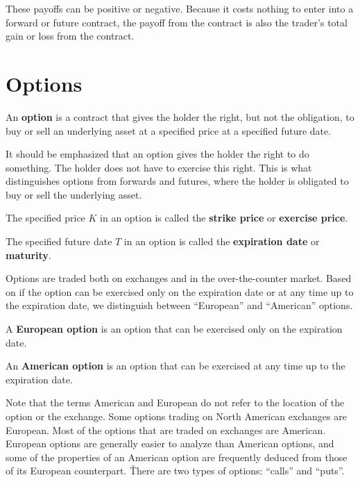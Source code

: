 These payoffs can be positive or negative. Because it costs nothing to enter into a forward or future contract, the
payoff from the contract is also the trader's total gain or loss from the contract.

\vspace{5pt}

\section{Options}

\bd[Option]
An \textbf{option} is a contract that gives the holder the right, but not the obligation, to buy or sell an underlying
asset at a specified price at a specified future date.
\ed

It should be emphasized that an option gives the holder the right to do something. The holder does not have to
exercise this right. This is what distinguishes options from forwards and futures, where the holder is obligated to
buy or sell the underlying asset.

The specified price $K$ in an option is called the \textbf{strike price} or \textbf{exercise price}.
\ed

The specified future date $T$ in an option is called the \textbf{expiration date} or \textbf{maturity}.
\ed

Options are traded both on exchanges and in the over-the-counter market. Based on if the option can be exercised only
on the expiration date or at any time up to the expiration date, we distinguish between ``European'' and ``American''
options.

A \textbf{European option} is an option that can be exercised only on the expiration date.
\ed

An \textbf{American option} is an option that can be exercised at any time up to the expiration date.
\ed

Note that the terms American and European do not refer to the location of the option or the exchange. Some options
trading on North American exchanges are European. Most of the options that are traded on exchanges are American.
European options are generally easier to analyze than American options, and some of the properties of an American
option are frequently deduced from those of its European counterpart. \v

There are two types of options: ``calls'' and ``puts''.

